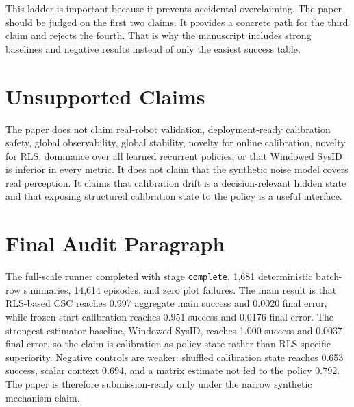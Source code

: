 \documentclass{article}
\begin{document}
This ladder is important because it prevents accidental overclaiming. The paper
should be judged on the first two claims. It provides a concrete path for the
third claim and rejects the fourth. That is why the manuscript includes strong
baselines and negative results instead of only the easiest success table.

\section{Unsupported Claims}

The paper does not claim real-robot validation, deployment-ready calibration
safety, global observability, global stability, novelty for online
calibration, novelty for RLS, dominance over all learned recurrent policies, or
that Windowed SysID is inferior in every metric. It does not claim that the
synthetic noise model covers real perception. It claims that calibration drift
is a decision-relevant hidden state and that exposing structured calibration
state to the policy is a useful interface.

\section{Final Audit Paragraph}

The full-scale runner completed with stage \texttt{complete}, 1,681
deterministic batch-row summaries, 14,614 episodes, and zero plot failures.
The main result is that RLS-based CSC reaches 0.997 aggregate main success and
0.0020 final error, while frozen-start calibration reaches 0.951 success and
0.0176 final error. The strongest estimator baseline, Windowed SysID, reaches
1.000 success and 0.0037 final error, so the claim is calibration as policy
state rather than RLS-specific superiority. Negative controls are weaker:
shuffled calibration state reaches 0.653 success, scalar context 0.694, and a
matrix estimate not fed to the policy 0.792. The paper is therefore
submission-ready only under the narrow synthetic mechanism claim.
\end{document}
